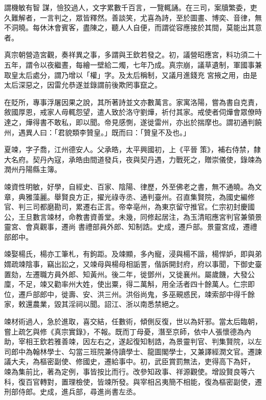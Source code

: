 \begin{pinyinscope}
 謂機敏有智
 謀，憸狡過人，文字累數千百言，一覽輒誦。在三司，案牘繁委，吏久難解者，一言判之，眾皆釋然。善談笑，尤喜為詩，至於圖畫、博奕、音律，無不洞曉。每休沐會賓客，盡陳之，聽人人自便，而謂從容應接於其間，莫能出其意者。



 真宗朝營造宮觀，奏祥異之事，多謂與王欽若發之。初，議營昭應宮，料功須二十五年，謂令以夜繼晝，每繪一壁給二燭，七年乃成。真宗崩，議草遺制，軍國事兼取皇太后處分，謂乃增以「權」字。及太后稱制，又議月進錢充
 宮掖之用，由是太后深惡之，因雷允恭遂並錄謂前後欺罔事竄之。



 在貶所，專事浮屠因果之說，其所著詩並文亦數萬言。家寓洛陽，嘗為書自克責，敘國厚恩，戒家人毋輒怨望，遣人致於洛守劉燁，祈付其家。戒使者伺燁會眾僚時達之，燁得書不敢私，即以聞。帝見感惻，遂徙雷州，亦出於揣摩也。謂初通判饒州，遇異人曰：「君貌類李贊皇。」既而曰：「贊皇不及也。」



 夏竦，字子喬，江州德安人。父承皓，太平興國初，上《平晉
 策》，補右侍禁，隸大名府。契丹內寇，承皓由間道發兵，夜與契丹遇，力戰死之，贈崇儀使，錄竦為潤州丹陽縣主簿。



 竦資性明敏，好學，自經史、百家、陰陽、律歷，外至佛老之書，無不通曉。為文章，典雅藻麗。舉賢良方正，擢光祿寺丞、通判臺州。召直集賢院，為國史編修官、判三司都磨勘司，累遷右正言。帝幸亳州，為東京留守推官。仁宗初封慶國公，王旦數言竦材，命教書資善堂。未幾，同修起居注，為玉清昭應宮判官兼領景靈宮、會真觀事，遷尚
 書禮部員外郎、知制誥。史成，遷戶部。景靈宮成，遷禮部郎中。



 竦娶楊氏，楊亦工筆札，有鉤距。及竦顯，多內寵，浸與楊不諧，楊悍妒，即與弟媦疏竦陰事，竊出訟之，又竦母與楊母相詬詈，偕訴開封府，府以事聞，下御史臺置劾，左遷職方員外郎、知黃州。後二年，徙鄧州，又徙襄州。屬歲饑，大發公廩，不足，竦又勸率州大姓，使出粟，得二萬斛，用全活者四十餘萬人。仁宗即位，遷戶部郎中，徙壽、安、洪三州。洪俗尚鬼，多巫覡惑民，竦索部中得千餘
 家，敕還農業，毀其淫祠以聞。詔江、浙以南悉禁絕之。



 竦材術過人，急於進取，喜交結，任數術，傾側反復，世以為奸邪。當太后臨朝，嘗上疏乞與修《真宗實錄》，不報。既而丁母憂，潛至京師，依中人張懷德為內助，宰相王欽若雅善竦，因左右之，遂起復知制誥，為景靈判官、判集賢院，以左司郎中為翰林學士、勾當三班院兼侍讀學士、龍圖閣學士，又兼譯經潤文官。遷諫議大夫，為樞密副使、修國史，遷給事中。初，武臣賞罰無法，吏得高下為奸，
 竦為集前比，著為定例，事皆按比而行。改參知政事、祥源觀使。增設賢良等六科，復百官轉對，置理檢使，皆竦所發。與宰相呂夷簡不相能，復為樞密副使，遷刑部侍郎。史成，進兵部，尋進尚書左丞。




\end{pinyinscope}
